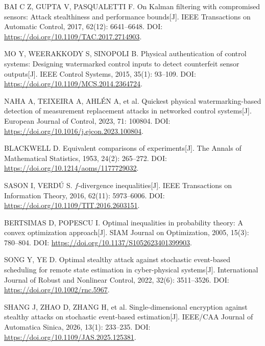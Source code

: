 BAI C Z, GUPTA V, PASQUALETTI F.
On Kalman filtering with compromised sensors: Attack stealthiness and performance bounds[J].
IEEE Transactions on Automatic Control, 2017, 62(12): 6641--6648.
DOI: \url{https://doi.org/10.1109/TAC.2017.2714903}.

MO Y, WEERAKKODY S, SINOPOLI B.
Physical authentication of control systems: Designing watermarked control inputs to detect counterfeit sensor outputs[J].
IEEE Control Systems, 2015, 35(1): 93--109.
DOI: \url{https://doi.org/10.1109/MCS.2014.2364724}.

NAHA A, TEIXEIRA A, AHL\'EN A, et al.
Quickest physical watermarking-based detection of measurement replacement attacks in networked control systems[J].
European Journal of Control, 2023, 71: 100804.
DOI: \url{https://doi.org/10.1016/j.ejcon.2023.100804}.

BLACKWELL D.
Equivalent comparisons of experiments[J].
The Annals of Mathematical Statistics, 1953, 24(2): 265--272.
DOI: \url{https://doi.org/10.1214/aoms/1177729032}.

SASON I, VERD\'U S.
$f$-divergence inequalities[J].
IEEE Transactions on Information Theory, 2016, 62(11): 5973--6006.
DOI: \url{https://doi.org/10.1109/TIT.2016.2603151}.

BERTSIMAS D, POPESCU I.
Optimal inequalities in probability theory: A convex optimization approach[J].
SIAM Journal on Optimization, 2005, 15(3): 780--804.
DOI: \url{https://doi.org/10.1137/S1052623401399903}.

SONG Y, YE D.
Optimal stealthy attack against stochastic event-based scheduling for remote state estimation in cyber-physical systems[J].
International Journal of Robust and Nonlinear Control, 2022, 32(6): 3511--3526.
DOI: \url{https://doi.org/10.1002/rnc.5967}.

SHANG J, ZHAO D, ZHANG H, et al.
Single-dimensional encryption against stealthy attacks on stochastic event-based estimation[J].
IEEE/CAA Journal of Automatica Sinica, 2026, 13(1): 233--235.
DOI: \url{https://doi.org/10.1109/JAS.2025.125381}.
